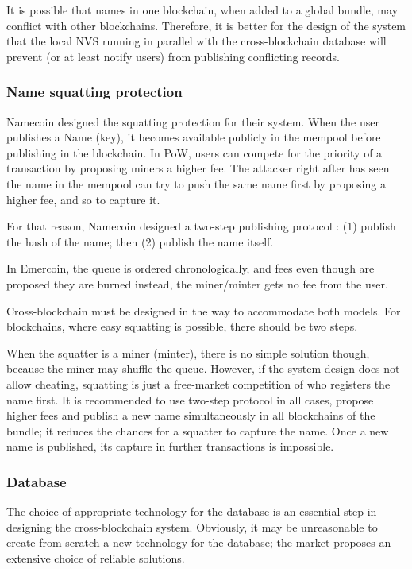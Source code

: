 \begin{multicols}{2}
It is possible that names in one blockchain, when added to a global bundle, may conflict with other blockchains. Therefore, it is better for the design of the system that the local NVS running in parallel with the cross-blockchain database will prevent (or at least notify users) from publishing conflicting records.

\subsubsection{Name squatting protection}\label{subsubsec-4.2.7}

Namecoin designed the squatting protection for their system. When the user publishes a Name (key), it becomes available publicly in the mempool before publishing in the blockchain. In PoW, users can compete for the priority of a transaction by proposing miners a higher fee. The attacker right after has seen the name in the mempool can try to push the same name first by proposing a higher fee, and so to capture it.

For that reason, Namecoin designed a two-step publishing protocol \cite{art1-key35}: (1) publish the hash of the name; then (2) publish the name itself.

In Emercoin, the queue is ordered chronologically, and fees even though are proposed they are burned instead, the miner/minter gets no fee from the user.

Cross-blockchain must be designed in the way to accommodate both models. For blockchains, where easy squatting is possible, there should be two steps.

When the squatter is a miner (minter), there is no simple solution though, because the miner may shuffle the queue. However, if the system design does not allow cheating, squatting is just a free-market competition of who registers the name first. It is recommended to use two-step protocol in all cases, propose higher fees and publish a new name simultaneously in all blockchains of the bundle; it reduces the chances for a squatter to capture the name. Once a new name is published, its capture in further transactions is impossible.

\subsubsection{Database}\label{subsubsec-4.2.8}

The choice of appropriate technology for the database is an essential step in designing the cross-blockchain system. Obviously, it may be unreasonable to create from scratch a new technology for the database; the market proposes an extensive choice of reliable solutions.


\end{multicols}
